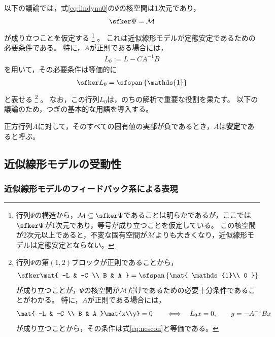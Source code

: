 \documentclass[tombow,dvipdfmx]{corona-a5-1.1}
\begin{document}
以下の議論では，式\ref{eq:lindynu0}の$\Psi$の核空間は1次元であり，
\[
\sfker \Psi = \mathcal{M}
\]
が成り立つことを仮定する
\footnote{
行列$\Psi$の構造から，$\mathcal{M} \subseteq \sfker \Psi $であることは明らかであるが，ここでは$\sfker \Psi$が1次元であり，等号が成り立つことを仮定している。
この核空間が2次元以上であると，不変な固有空間が$\mathcal{M}$よりも大きくなり，近似線形モデルは定態安定とならない。
}
。
これは近似線形モデルが定態安定であるための必要条件である。
特に，$A$が正則である場合には，
\begin{align}\label{eq:defL0}
L_0:= L-CA^{-1}B 
\end{align}
を用いて，その必要条件は等価的に
\begin{align}\label{eq:nescon}
\sfker L_0 = \sfspan
\left\{
\mathds{1}
\right\}
\end{align}
と表せる
\footnote{
行列$\Psi$の第$(1,2)$ブロックが正則であることから，
\begin{align*}%
\sfker \mat{
-L & -C \\
B & A
}
= \sfspan
\left\{
\mat{
\mathds{1}\\
0
}
\right\}
\end{align*}
が成り立つことが，$\Psi$の核空間が$\mathcal{M}$だけであるための必要十分条件であることがわかる。
特に，$A$が正則である場合には，
\begin{align*}
\mat{
-L & -C \\
B & A
}\mat{x\\y}
=0
\qquad
\Longleftrightarrow
\quad
L_0 x=0,
\qquad
y=-A^{-1}Bx
\end{align*}
が成り立つことから，その条件は式\ref{eq:nescon}と等価である。
}
。
なお，この行列$L_0$は，のちの解析で重要な役割を果たす。
以下の議論のため，つぎの基本的な用語を導入する。

\begin{定義}[正方行列の安定性]
\label{def:matsta}
正方行列$A$に対して，そのすべての固有値の実部が負であるとき，$A$は\textbf{安定}であると呼ぶ。
\end{定義}



\subsection{近似線形モデルの受動性\advanced}\label{sec:linpasana}

\subsubsection{近似線形モデルのフィードバック系による表現}
\end{document}
